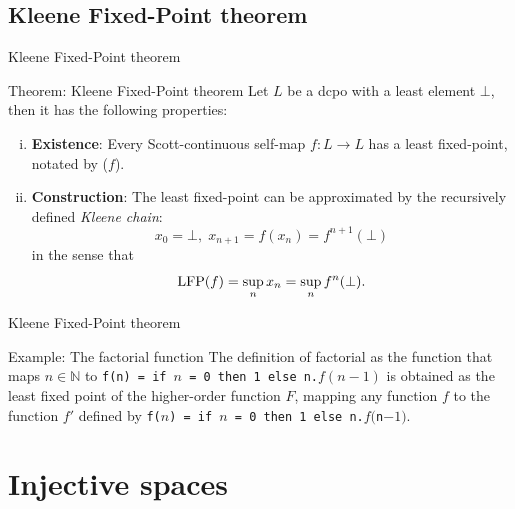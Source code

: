 \documentclass{beamer}
\newcommand{\N}{\mathbb{N}}
\newcommand{\LFP}{\text{LFP}}
\begin{document}
\subsection{Kleene Fixed-Point theorem}
\begin{frame}{Kleene Fixed-Point theorem}
\begin{block}{Theorem: Kleene Fixed-Point theorem} Let $L$ be a dcpo with a least element $\bot$, then it has the following properties:
\begin{enumerate}[(i)]
  \item \textbf{Existence}: Every Scott-continuous self-map $f: L \rightarrow L$ has a least fixed-point, notated by \LFP($f$).
  \item \textbf{Construction}: The least fixed-point can be approximated by the recursively defined \emph{Kleene chain}:
      $$x_0 = \bot, \; x_{n+1} = f(x_n) = f^{n+1}(\bot)$$
      in the sense that
      $$\text{\LFP}(f) = \sup_n x_n = \sup_n f^n(\bot).$$
\end{enumerate}
\end{block}

\end{frame}

\begin{frame}{Kleene Fixed-Point theorem}
\begin{block}{Example: The factorial function}
The definition of factorial as the function that maps $n \in \N$ to \texttt{f(n) = if $n$ = 0 then 1 else n.$f(n-1)$} is obtained as the least fixed point of the higher-order function $F$, mapping any function $f$ to the function $f'$ defined by \texttt{f($n$) = if $n$ = 0 then 1 else n.$f($n$-1)$}.
\end{block}
\end{frame}


\section{Injective spaces}
\end{document}
